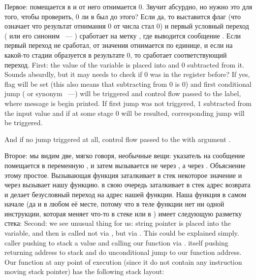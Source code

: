 \IFRU
{Первое:  помещается в \EAX и от него отнимается 0. Звучит абсурдно, но нужно это для того, чтобы проверить, 
0 ли в \EAX был до этого? Если да, то выставится флаг \ZF (что означает что результат отнимания $0$ от числа 
стал $0$) и первый условный переход \JE ( или его синоним \JZ ~--- ) 
сработает на метку , где выводится сообщение .
Если первый переход не сработал, от значения отнимается по единице, 
и если на какой-то стадии образуется в результате $0$, то сработает соответствующий переход.}
{First: the value of the  variable is placed into \EAX and $0$ subtracted from it. Sounds absurdly, but it may needs to check if 
$0$ was in the \EAX register before? If yes, flag \ZF will be set (this also means that subtracting from $0$ is $0$) 
and first conditional jump \JE ( or synonym \JZ~---) will be triggered 
and control flow passed to the  label, where  message is begin printed. 
If first jump was not triggered, $1$ subtracted from the input value and if at some stage $0$ will be resulted, 
corresponding jump will be triggered.}

{And if no jump triggered at all, control flow passed to the \printf with argument .}

\label{jump_to_last_printf}
\index{\Stack}
\IFRU
{Второе: мы видим две, мягко говоря, необычные вещи: указатель на сообщение помещается в переменную , 
и затем \printf вызывается не через \CALL, а через \JMP. Объяснение этому простое. 
Вызывающая функция заталкивает в стек некоторое значение и через \CALL вызывает нашу функцию. 
\CALL в свою очередь заталкивает в стек адрес возврата и делает безусловный переход на адрес нашей функции. 
Наша функция в самом начале (да и в любом её месте, потому что в теле функции нет ни одной инструкции, 
которая меняет что-то в стеке или в \ESP) имеет следующую разметку стека:}
{Second: we see unusual thing for us: string pointer is placed into the  variable, and 
then \printf is called not via \CALL, but via \JMP. This could be explained simply. 
\Gls{caller} pushing to stack a value and calling our function via \CALL. 
\CALL itself pushing returning address to stack and do unconditional jump to our function address. 
Our function at any point of execution (since it do not contain any instruction moving stack 
pointer) has the following stack layout:}

